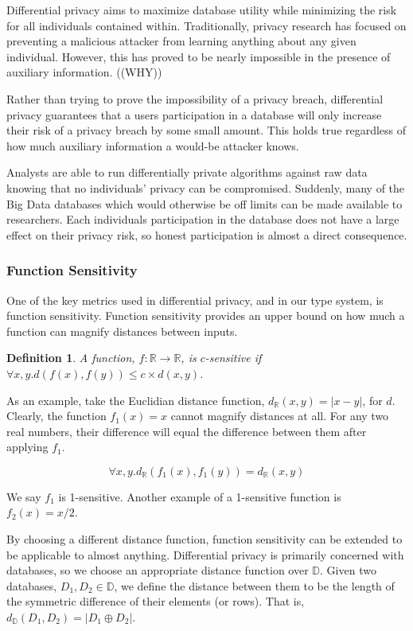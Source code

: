 \documentclass[12pt]{article}
\newtheorem{defn}{Definition}[section]
\begin{document}
Differential privacy aims to maximize database utility while minimizing the risk for all individuals contained within.
Traditionally, privacy research has focused on preventing a malicious attacker from learning anything about any given individual.
However, this has proved to be nearly impossible in the presence of auxiliary information. ((WHY))

Rather than trying to prove the impossibility of a privacy breach, differential privacy guarantees that a users participation in a database will only increase their risk of a privacy breach by some small amount.
This holds true regardless of how much auxiliary information a would-be attacker knows.

Analysts are able to run differentially private algorithms against raw data knowing that no individuals' privacy can be compromised.
Suddenly, many of the Big Data databases which would otherwise be off limits can be made available to researchers.
Each individuals participation in the database does not have a large effect on their privacy risk, so honest participation is almost a direct consequence.

\subsubsection{Function Sensitivity}

One of the key metrics used in differential privacy, and in our type system, is function sensitivity.
Function sensitivity provides an upper bound on how much a function can magnify distances between inputs.

\begin{defn}\label{def:csens}
  A function, $f : \mathbb{R} \rightarrow \mathbb{R}$, is $c$-sensitive if
  $\forall x,y.d(f(x),f(y)) \le c \times d(x,y)$.
\end{defn}

As an example, take the Euclidian distance function, $d_\mathbb{R}(x,y) = |x - y|$, for $d$.
Clearly, the function $f_1(x)=x$ cannot magnify distances at all.
For any two real numbers, their difference will equal the difference between them after applying $f_1$.

\[
  \forall x,y.d_\mathbb{R}(f_1(x),f_1(y)) = d_\mathbb{R}(x,y)
\]

We say $f_1$ is 1-sensitive.
Another example of a 1-sensitive function is $f_2(x) = x/2$.

By choosing a different distance function, function sensitivity can be extended to be applicable to almost anything.
Differential privacy is primarily concerned with databases, so we choose an appropriate distance function over $\mathbb{D}$.
Given two databases, $D_1, D_2 \in \mathbb{D}$, we define the distance between them to be the length of the symmetric difference of their elements (or rows).
That is, $d_\mathbb{D}(D_1,D_2) = |D_1 \oplus D_2|$.
\end{document}
